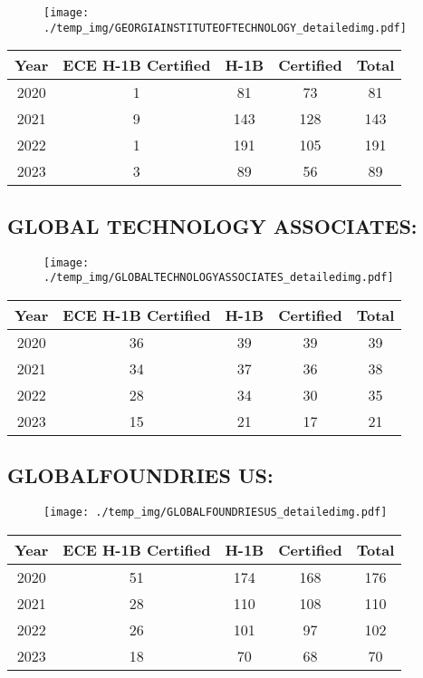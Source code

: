 \documentclass{article}%
\begin{document}
\begin{figure}[htbp]%
\centering%
\texttt{[image: ./temp\_img/GEORGIAINSTITUTEOFTECHNOLOGY\_detailedimg.pdf]}%
\end{figure}

%
\begin{longtable}{c|c|c|c|c}%
\hline%
Year&ECE H{-}1B Certified&H{-}1B&Certified&Total\\%
\hline%
2020&1&81&73&81\\%
\hline%
2021&9&143&128&143\\%
\hline%
2022&1&191&105&191\\%
\hline%
2023&3&89&56&89\\%
\hline%
\end{longtable}

%
\newpage%
\subsection{GLOBAL TECHNOLOGY ASSOCIATES:}%
\label{subsec:GLOBALTECHNOLOGYASSOCIATES}%
\label{GLOBALTECHNOLOGYASSOCIATESdetailed}%


\begin{figure}[htbp]%
\centering%
\texttt{[image: ./temp\_img/GLOBALTECHNOLOGYASSOCIATES\_detailedimg.pdf]}%
\end{figure}

%
\begin{longtable}{c|c|c|c|c}%
\hline%
Year&ECE H{-}1B Certified&H{-}1B&Certified&Total\\%
\hline%
2020&36&39&39&39\\%
\hline%
2021&34&37&36&38\\%
\hline%
2022&28&34&30&35\\%
\hline%
2023&15&21&17&21\\%
\hline%
\end{longtable}

%
\newpage%
\subsection{GLOBALFOUNDRIES US:}%
\label{subsec:GLOBALFOUNDRIESUS}%
\label{GLOBALFOUNDRIESUSdetailed}%


\begin{figure}[htbp]%
\centering%
\texttt{[image: ./temp\_img/GLOBALFOUNDRIESUS\_detailedimg.pdf]}%
\end{figure}

%
\begin{longtable}{c|c|c|c|c}%
\hline%
Year&ECE H{-}1B Certified&H{-}1B&Certified&Total\\%
\hline%
2020&51&174&168&176\\%
\hline%
2021&28&110&108&110\\%
\hline%
2022&26&101&97&102\\%
\hline%
2023&18&70&68&70\\%
\hline%
\end{longtable}
\end{document}
